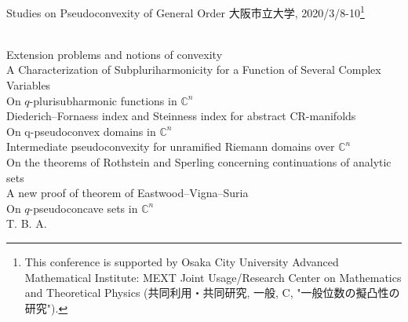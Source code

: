 \documentclass[a4]{article}
\theoremstyle{plain} %
\theoremstyle{definition} %
\begin{document}
\begin{center}
  {\huge Studies on Pseudoconvexity of General Order}
\vskip5mm
{\large 大阪市立大学, 2020/3/8-10}\footnote{This conference is supported by Osaka City University Advanced Mathematical Institute: MEXT Joint Usage/Research Center on Mathematics and Theoretical Physics (共同利用・共同研究, 一般, C, "一般位数の擬凸性の研究"). }
\end{center}

\vskip8mm
\vskip5mm
\vskip2mm
\\
Extension problems and notions of convexity
\vskip3mm
\\
A Characterization of Subpluriharmonicity for a Function of Several Complex Variables
\vskip3mm
\\
On $q$-plurisubharmonic functions in $\mathbb{C}^n$
\vskip3mm
\\
Diederich--Fornaess index and Steinness index for abstract CR-manifolds
\vskip8mm
\vskip2mm
\\
On q-pseudoconvex domains in $\mathbb{C}^n$
\vskip3mm
\\
Intermediate pseudoconvexity for unramified Riemann domains over $\mathbb{C}^n$
\vskip3mm
\\
On the theorems of Rothstein and Sperling concerning continuations of analytic sets
\vskip3mm
\\
A new proof of  theorem of Eastwood--Vigna--Suria
\vskip8mm
\vskip2mm
\\
On $q$-pseudoconcave sets in $\mathbb{C}^n$
\vskip3mm
\\
T. B. A. 


\newpage
\end{document}
